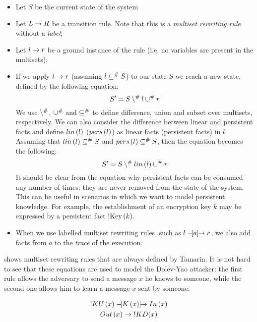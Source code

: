 \begin{itemize}
  \item{Let $S$ be the current state of the system}
  \item{Let $L \rightarrow R$ be a transition rule. Note that this is a \textit{multiset rewriting rule} without a \textit{label};}
  \item{Let $l \rightarrow r$ be a ground instance of the rule (i.e. no variables are present in the multisets);}
  \item{If we apply $l \rightarrow r$ (assuming $l \subseteq^\# S$) to our state $S$ we reach a new state, defined by the following equation:
              \begin{equation}
                S' = S \setminus^\# l \cup^\# r
              \end{equation}
              We use $\setminus^\#$, $\cup^\#$ and $\subseteq^\#$ to define difference, union and subset over multisets, respectively. We can also consider the difference between linear and persistent facts and define $lin\left(l\right)$ ($pers\left(l\right)$) as linear facts (persistent facts) in $l$. Assuming that $lin\left(l\right) \subseteq^\# S$ and $pers\left(l\right) \subseteq^\# S$, then the equation becomes the following:
              \begin{equation}
                S' = S \setminus^\# lin\left(l\right) \cup^\# r
              \end{equation}
              It should be clear from the equation why persistent facts can be consumed any number of times: they are never removed from the state of the system. This can be useful in scenarios in which we want to model persistent knowledge. For example, the establishment of an encryption key $k$ may be expressed by a persistent fact $\mbox{!Key}\left(k\right)$.
        }
  \item{When we use labelled multiset rewriting rules, such as $l \mathrel{-\hspace{-2pt}[a]\hspace{-4pt}\to} r$, we also add facts from $a$ to the \textit{trace} of the execution.}
\end{itemize}

 shows multiset rewriting rules that are always defined by Tamarin. It is not hard to see that these equations are used to model the Dolev-Yao attacker: the first rule allows the adversary to send a message $x$ he knows to someone, while the second one allows him to learn a message $x$ sent by someone.

\begin{equation}
  \label{eq:built-in-tamarin-msr-rules}
  \begin{gathered}
    !KU\left(x\right) \mathrel{-\hspace{-2pt}[K\left(x\right)]\hspace{-4pt}\to} In\left(x\right)\\
    Out\left(x\right) \rightarrow \ !KD(x)
  \end{gathered}
\end{equation}


